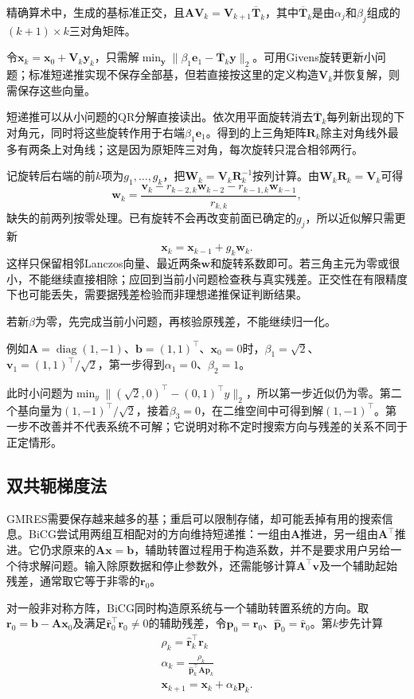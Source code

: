精确算术中，生成的基标准正交，且$\bm A\bm V_k=\bm V_{k+1}\overline{\bm T}_k$，其中$\overline{\bm T}_k$是由$\alpha_j$和$\beta_j$组成的$(k+1)\times k$三对角矩阵。

令$\bm x_k=\bm x_0+\bm V_k\bm y_k$，只需解$\min_{\bm y}\lVert\beta_1\bm e_1-\overline{\bm T}_k\bm y\rVert_2$。可用Givens旋转更新小问题；标准短递推实现不保存全部基，但若直接按这里的定义构造$\bm V_k$并恢复解，则需保存这些向量。

短递推可以从小问题的QR分解直接读出。依次用平面旋转消去$\overline{\bm T}_k$每列新出现的下对角元，同时将这些旋转作用于右端$\beta_1\bm e_1$。得到的上三角矩阵$\bm R_k$除主对角线外最多有两条上对角线；这是因为原矩阵三对角，每次旋转只混合相邻两行。

记旋转后右端的前$k$项为$g_1,\ldots,g_k$，把$\bm W_k=\bm V_k\bm R_k^{-1}$按列计算。由$\bm W_k\bm R_k=\bm V_k$可得
\[
 \bm w_k=\frac{\bm v_k-r_{k-2,k}\bm w_{k-2}-r_{k-1,k}\bm w_{k-1}}{r_{k,k}},
\]
缺失的前两列按零处理。已有旋转不会再改变前面已确定的$g_j$，所以近似解只需更新
\[
 \bm x_k=\bm x_{k-1}+g_k\bm w_k.
\]
这样只保留相邻Lanczos向量、最近两条$\bm w$和旋转系数即可。若三角主元为零或很小，不能继续直接相除；应回到当前小问题检查秩与真实残差。正交性在有限精度下也可能丢失，需要据残差检验而非理想递推保证判断结果。

若新$\beta$为零，先完成当前小问题，再核验原残差，不能继续归一化。

例如$\bm A=\operatorname{diag}(1,-1)$、$\bm b=(1,1)^\top$、$\bm x_0=0$时，$\beta_1=\sqrt2$、$\bm v_1=(1,1)^\top/\sqrt2$，第一步得到$\alpha_1=0$、$\beta_2=1$。

此时小问题为$\min_y\lVert(\sqrt2,0)^\top-(0,1)^\top y\rVert_2$，所以第一步近似仍为零。第二个基向量为$(1,-1)^\top/\sqrt2$，接着$\beta_3=0$，在二维空间中可得到解$(1,-1)^\top$。第一步不改善并不代表系统不可解；它说明对称不定时搜索方向与残差的关系不同于正定情形。

\subsection{双共轭梯度法}

GMRES需要保存越来越多的基；重启可以限制存储，却可能丢掉有用的搜索信息。BiCG尝试用两组互相配对的方向维持短递推：一组由$\bm A$推进，另一组由$\bm A^\top$推进。它仍求原来的$\bm A\bm x=\bm b$，辅助转置过程用于构造系数，并不是要求用户另给一个待求解问题。输入除原数据和停止参数外，还需能够计算$\bm A^\top\bm v$及一个辅助起始残差，通常取它等于非零的$\bm r_0$。

对一般非对称方阵，BiCG同时构造原系统与一个辅助转置系统的方向。取$\bm r_0=\bm b-\bm A\bm x_0$及满足$\widehat{\bm r}_0^\top\bm r_0\ne0$的辅助残差，令$\bm p_0=\bm r_0$、$\widehat{\bm p}_0=\widehat{\bm r}_0$。第$k$步先计算
\[
 \begin{gathered}
\rho_k=\widehat{\bm r}_k^\top\bm r_k\\
\alpha_k=\frac{\rho_k}{\widehat{\bm p}_k^\top\bm A\bm p_k}\\
\bm x_{k+1}=\bm x_k+\alpha_k\bm p_k.
 \end{gathered}
\]

